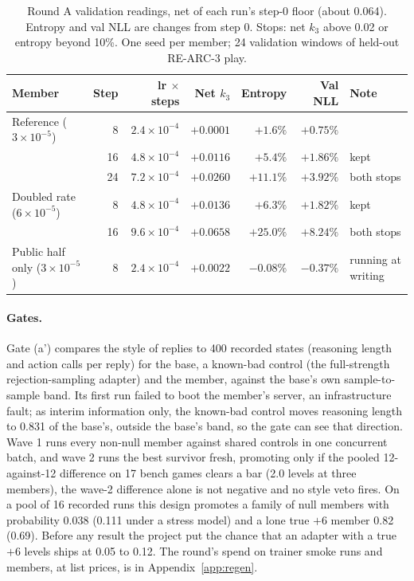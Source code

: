 \begin{table}[!htb]
\caption{Round A validation readings, net of each run's step-0 floor (about 0.064). Entropy and val NLL are changes from step 0. Stops: net $k_3$ above 0.02 or entropy beyond 10\%. One seed per member; 24 validation windows of held-out RE-ARC-3 play.}\label{tab:grpoval} %
\centering\footnotesize
\begin{tabular}{@{}lrrrrrl@{}}
\toprule
Member & Step & lr $\times$ steps & Net $k_3$ & Entropy & Val NLL & Note \\
\midrule
Reference ($3\times10^{-5}$) & 8 & $2.4\times10^{-4}$ & $+0.0001$ & $+1.6\%$ & $+0.75\%$ & \\
 & 16 & $4.8\times10^{-4}$ & $+0.0116$ & $+5.4\%$ & $+1.86\%$ & kept \\
 & 24 & $7.2\times10^{-4}$ & $+0.0260$ & $+11.1\%$ & $+3.92\%$ & both stops \\
Doubled rate ($6\times10^{-5}$) & 8 & $4.8\times10^{-4}$ & $+0.0136$ & $+6.3\%$ & $+1.82\%$ & kept \\
 & 16 & $9.6\times10^{-4}$ & $+0.0658$ & $+25.0\%$ & $+8.24\%$ & both stops \\
Public half only ($3\times10^{-5}$) & 8 & $2.4\times10^{-4}$ & $+0.0022$ & $-0.08\%$ & $-0.37\%$ & running at writing \\
\bottomrule
\end{tabular}
\end{table}

\paragraph{Gates.}
Gate (a') compares the style of replies to 400 recorded states (reasoning length and action calls per reply) for the base, a known-bad control (the full-strength rejection-sampling adapter) and the member, against the base's own sample-to-sample band. %
Its first run failed to boot the member's server, an infrastructure fault; as interim information only, the known-bad control moves reasoning length to 0.831 of the base's, outside the base's band, so the gate can see that direction. %
Wave 1 runs every non-null member against shared controls in one concurrent batch, and wave 2 runs the best survivor fresh, promoting only if the pooled 12-against-12 difference on 17 bench games clears a bar (2.0 levels at three members), the wave-2 difference alone is not negative and no style veto fires. %
On a pool of 16 recorded runs this design promotes a family of null members with probability 0.038 (0.111 under a stress model) and a lone true $+6$ member 0.82 (0.69). %
Before any result the project put the chance that an adapter with a true $+6$ levels ships at 0.05 to 0.12. %
The round's spend on trainer smoke runs and members, at list prices, is in Appendix~\ref{app:regen}. %
